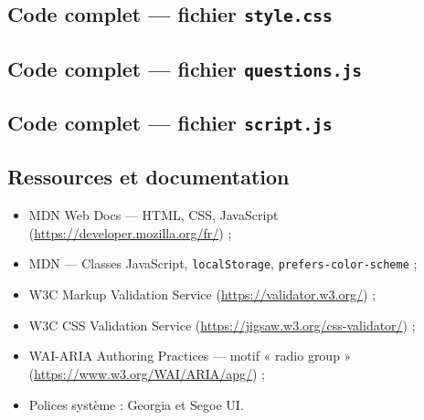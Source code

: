 \documentclass[11pt,a4paper]{article}
\begin{document}
\subsection{Code complet --- fichier \texttt{style.css}}


\subsection{Code complet --- fichier \texttt{questions.js}}


\subsection{Code complet --- fichier \texttt{script.js}}


\subsection{Ressources et documentation}
\begin{itemize}
  \item MDN Web Docs --- HTML, CSS, JavaScript (\url{https://developer.mozilla.org/fr/}) ;
  \item MDN --- Classes JavaScript, \texttt{localStorage}, \texttt{prefers-color-scheme} ;
  \item W3C Markup Validation Service (\url{https://validator.w3.org/}) ;
  \item W3C CSS Validation Service (\url{https://jigsaw.w3.org/css-validator/}) ;
  \item WAI-ARIA Authoring Practices --- motif « radio group » (\url{https://www.w3.org/WAI/ARIA/apg/}) ;
  \item Polices système : Georgia et Segoe UI.
\end{itemize}
\end{document}
